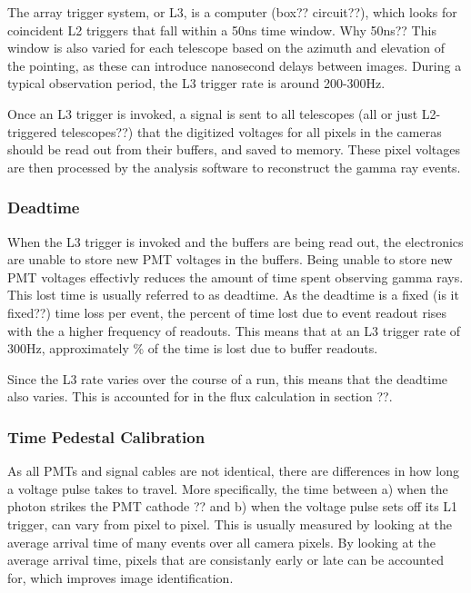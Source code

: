 The array trigger system, or L3, is a computer (box?? circuit??), which looks for coincident L2 triggers that fall within a \nicetilde50ns time window.
Why 50ns??
This window is also varied for each telescope based on the azimuth and elevation of the pointing, as these can introduce nanosecond delays between images.
During a typical observation period, the L3 trigger rate is around 200-300Hz.

Once an L3 trigger is invoked, a signal is sent to all telescopes (all or just L2-triggered telescopes??) that the digitized voltages for all pixels in the cameras should be read out from their buffers, and saved to memory.
These pixel voltages are then processed by the analysis software to reconstruct the gamma ray events.



\subsubsection{Deadtime}
When the L3 trigger is invoked and the buffers are being read out, the electronics are unable to store new PMT voltages in the buffers.
Being unable to store new PMT voltages effectivly reduces the amount of time spent observing gamma rays.
This lost time is usually referred to as deadtime.
As the deadtime is a fixed (is it fixed??) time loss per event, the percent of time lost due to event readout rises with the a higher frequency of readouts.
This means that at an L3 trigger rate of \nicetilde300Hz, approximately \% of the time is lost due to buffer readouts.

Since the L3 rate varies over the course of a run, this means that the deadtime also varies.
This is accounted for in the flux calculation in section ??.

\subsubsection{Time Pedestal Calibration}
As all PMTs and signal cables are not identical, there are differences in how long a voltage pulse takes to travel.
More specifically, the time between a) when the photon strikes the PMT cathode ?? and b) when the voltage pulse sets off its L1 trigger, can vary from pixel to pixel.
This is usually measured by looking at the average arrival time of many events over all camera pixels.
By looking at the average arrival time, pixels that are consistanly early or late can be accounted for, which improves image identification.


